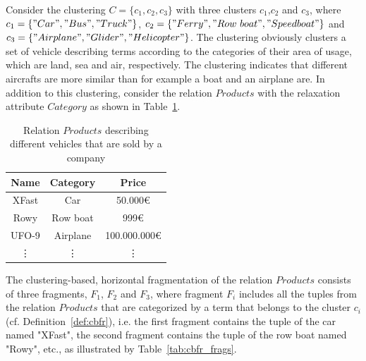 \begin{exmp}
\label{sec:meth_cbfr_exmp}
Consider the clustering $C=\{c_1, c_2, c_3\}$ with three clusters $c_1$,$c_2$ and $c_3$, where $c_1=\{"Car","Bus","Truck"\}$, 
$c_2=\{"Ferry","Row~boat","Speedboat"\}$ and $c_3=\{"Airplane","Glider","Helicopter"\}$. The clustering obviously clusters a set of vehicle describing 
terms according to the categories of their area of usage, which are land, sea and air, respectively. The clustering indicates that different aircrafts 
are more similar than for example a boat and an airplane are. In addition to this clustering, consider the relation $Products$ with the relaxation
attribute $Category$ as shown in Table~\ref{tab:cbfr_products}.

\begin{table}[h]
    \centering
    \begin{tabular}{|c|c|c|}
        \hline
        Name & Category & Price \\
        \hline
        XFast & Car & 50.000€ \\
        Rowy & Row boat & 999€ \\
        UFO-9 & Airplane & 100.000.000€ \\
        \vdots & \vdots & \vdots \\
        \hline
    \end{tabular}
    \caption{Relation $Products$ describing different vehicles that are sold by a company}
    \label{tab:cbfr_products}
\end{table}

The clustering-based, horizontal fragmentation of the relation $Products$ consists of three fragments, $F_1$, $F_2$ and $F_3$, where fragment $F_i$
includes all the tuples from the relation $Products$ that are categorized by a term that belongs to the cluster $c_i$ (cf. Definition~\ref{def:cbfr}), 
i.e. the first fragment contains the tuple of the car named "XFast", the second fragment contains the tuple of the row boat named "Rowy", etc., as
illustrated by Table~\ref{tab:cbfr_frags}.


\end{exmp}
